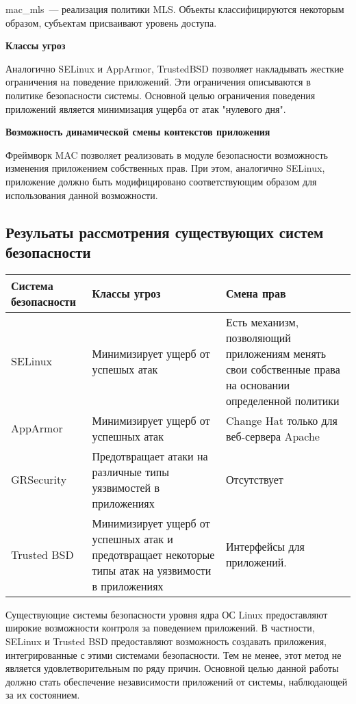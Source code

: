 mac\_mls~--- реализация политики MLS. Объекты 
классифицируются  некоторым образом, субъектам 
присваивают уровень доступа. 

\bigskip 
{\bfseries Классы угроз} 

Аналогично SELinux и AppArmor, TrustedBSD позволяет 
накладывать жесткие ограничения на поведение приложений. 
Эти ограничения описываются в политике безопасности системы.
Основной целью ограничения поведения приложений является 
минимизация ущерба от атак "нулевого дня". 

\bigskip  
{\bfseries Возможность динамической смены контекстов приложения} 

Фреймворк MAC позволяет реализовать в модуле 
безопасности возможность изменения приложением 
собственных прав. При этом, аналогично SELinux, 
приложение должно быть модифицировано соответствующим 
образом для использования данной возможности. 

\subsection{Резульаты рассмотрения существующих 
систем безопасности} 

\bigskip
\begin{center}
\begin{tabular}{|p{4cm}|p{5cm}|p{5cm}|} 
\hline
Система безопасности & Классы угроз & Смена прав \\
\hline
SELinux	& Минимизирует ущерб от успешых атак & Есть механизм, 
позволяющий приложениям менять свои собственные права на основании
определенной политики \\
\hline
AppArmor & Минимизирует ущерб от успешных атак & 
Change Hat только для веб-сервера Apache \\ 
\hline 
GRSecurity & Предотвращает атаки на различные типы уязвимостей в приложениях & 
Отсутствует \\ 
\hline
Trusted BSD & Минимизирует ущерб от успешных атак и предотвращает некоторые 
типы атак на уязвимости в приложениях & Интерфейсы для приложений.\\
\hline
\end{tabular} 
\end{center} 

\bigskip
Существующие системы безопасности уровня ядра ОС Linux 
предоставляют широкие возможности контроля за поведением 
приложений. В частности, SELinux и Trusted BSD 
 предоставляют возможность 
создавать приложения, интегрированные с этими системами 
безопасности. Тем не менее, этот метод не является 
удовлетворительным по ряду причин.  
Основной целью данной работы 
должно стать обеспечение независимости 
приложений от системы, наблюдающей за их 
состоянием.

\bigskip
